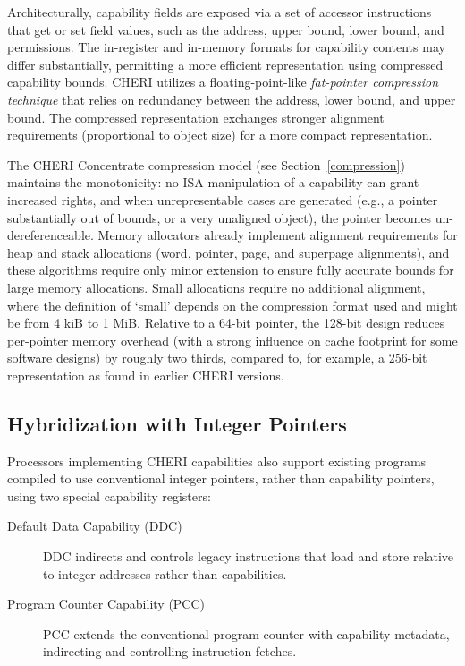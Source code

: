 Architecturally, capability fields are exposed via a set of accessor
instructions that get or set field values, such as the address, upper bound,
lower bound, and permissions.
The in-register and in-memory formats for capability contents may differ
substantially, permitting a more efficient representation using compressed
capability bounds.
CHERI utilizes a floating-point-like \textit{fat-pointer compression
technique} that relies on redundancy between the address, lower bound, and
upper bound.
The compressed representation exchanges stronger alignment requirements
(proportional to object size) for a more compact representation.

The CHERI Concentrate compression model (see Section~\ref{compression}) maintains the monotonicity:
no ISA manipulation of a
capability can grant increased rights, and when unrepresentable cases are
generated
(e.g., a pointer substantially out of bounds, or a very unaligned object),
the pointer becomes un-dereferenceable.
Memory allocators already implement alignment requirements for heap and stack
allocations (word, pointer, page, and superpage alignments), and these
algorithms require only minor extension to ensure fully accurate bounds for
large memory allocations. Small allocations require no additional
alignment, where the definition of `small' depends on the compression format used and might be from 4 kiB to 1 MiB.
Relative to a 64-bit pointer, the 128-bit design reduces per-pointer memory
overhead (with a strong influence on cache footprint for some software
designs) by roughly two thirds, compared to, for example, a 256-bit
representation as found in earlier CHERI versions.

\subsection{Hybridization with Integer Pointers}
\label{sec:model-hybridization-integer-pointers}

Processors implementing CHERI capabilities also support existing programs
compiled to use conventional integer pointers, rather than capability
pointers, using two special capability registers:

\begin{description}
\item[Default Data Capability (DDC)] DDC indirects and controls legacy
  instructions that load and store relative to integer addresses rather than
  capabilities.

\item[Program Counter Capability (PCC)] PCC extends the conventional program
  counter with capability metadata, indirecting and controlling instruction
  fetches.
\end{description}

